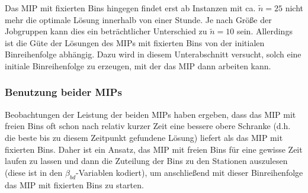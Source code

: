 \documentclass{scrreprt}
\begin{document}
Das MIP mit fixierten Bins hingegen findet erst ab Instanzen mit ca. $\tilde{n}=25$ nicht mehr die optimale Lösung innerhalb von einer Stunde.
Je nach Größe der Jobgruppen kann dies ein beträchtlicher Unterschied zu $\tilde{n}=10$ sein. 
Allerdings ist die Güte der Lösungen des MIPs mit fixierten Bins von der initialen Binreihenfolge abhängig.
Dazu wird in diesem Unterabschnitt versucht, solch eine initiale Binreihenfolge zu erzeugen, mit der das MIP dann arbeiten kann.

\subsubsection{Benutzung beider MIPs}
Beobachtungen der Leistung der beiden MIPs haben ergeben, dass das MIP mit freien Bins oft schon nach relativ kurzer Zeit eine bessere obere Schranke
(d.h. die beste bis zu diesem Zeitpunkt gefundene Lösung) liefert als das MIP mit fixierten Bins.
Daher ist ein Ansatz, das MIP mit freien Bins für eine gewisse Zeit laufen zu lassen und dann die Zuteilung der Bins zu den Stationen
auszulesen (diese ist in den $\beta_{bd}$-Variablen kodiert), um anschließend mit dieser Binreihenfolge das MIP mit fixierten Bins zu starten.
\end{document}

